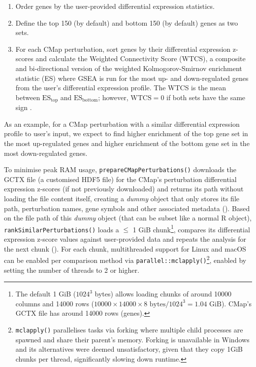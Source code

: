 \begin{enumerate}
	\item Order genes by the user-provided differential expression statistics.
	\item Define the top 150 (by default) and bottom 150 (by default) genes as two sets.
	\item For each CMap perturbation, sort genes by their differential expression z-scores and calculate the Weighted Connectivity Score (WTCS), a composite and bi-directional version of the weighted Kolmogorov-Smirnov enrichment statistic (ES) \cite{subramanian:2017ul} where GSEA is run for the most up- and down-regulated genes from the user’s differential expression profile. The WTCS is the mean between $\textrm{ES}_{\textrm{top}}$ and $\textrm{ES}_{\textrm{bottom}}$; however, $\textrm{WTCS} = 0$ if both sets have the same sign \cite{subramanian:2017ul}.
\end{enumerate}

As an example, for a CMap perturbation with a similar differential expression profile to user’s input, we expect to find higher enrichment of the top gene set in the most up-regulated genes and higher enrichment of the bottom gene set in the most down-regulated genes.

To minimise peak RAM usage, \texttt{prepareCMapPerturbations()} downloads the GCTX file (a customised HDF5 file) for the CMap’s perturbation differential expression z-scores (if not previously downloaded) and returns its path without loading the file content itself, creating a \emph{dummy} object that only stores its file path, perturbation names, gene symbols and other associated metadata (). Based on the file path of this \emph{dummy} object (that can be subset like a normal R object), \texttt{rankSimilarPerturbations()} loads a $\le$ 1 GiB chunk\footnote{The default 1 GiB ($1024^3$ bytes) allows loading chunks of around 10000 columns and 14000 rows ($10000 \times 14000 \times 8 \textrm{ bytes} / 1024^3 = 1.04 \textrm{ GiB}$). CMap's GCTX file has around 14000 rows (genes).}, compares its differential expression z-score values against user-provided data and repeats the analysis for the next chunk (). For each chunk, multithreaded support for Linux and macOS can be enabled per comparison method via \texttt{parallel::mclapply()}\footnote{\texttt{mclapply()} parallelises tasks via forking where multiple child processes are spawned and share their parent's memory. Forking is unavailable in Windows and its alternatives were deemed unsatisfactory, given that they copy 1GiB chunks per thread, significantly slowing down runtime.}, enabled by setting the number of threads to 2 or higher.

